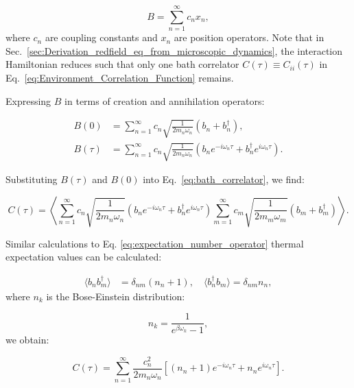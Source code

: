 \begin{equation} \label{eq:bath_operator}
	B = \sum_{n=1}^{\infty} c_n x_n,
\end{equation}
where \( c_n \) are coupling constants and \( x_n \) are position operators. Note that in Sec.~\ref{sec:Derivation_redfield_eq_from_microscopic_dynamics}, the interaction Hamiltonian reduces such that only one bath correlator \( C(\tau) \equiv C_{ii}(\tau) \) in Eq.~\eqref{eq:Environment_Correlation_Function} remains.

Expressing \( B \) in terms of creation and annihilation operators:

\begin{align}
	B(0)    & = \sum_{n=1}^{\infty} c_n \sqrt{\frac{1}{2 m_n \omega_n}} (b_n + b_n^\dagger), \label{eq:bath_operator_t0}                                                        \\
	B(\tau) & = \sum_{n=1}^{\infty} c_n \sqrt{\frac{1}{2 m_n \omega_n}} \left( b_n e^{-i \omega_n \tau} + b_n^\dagger e^{i \omega_n \tau} \right). \label{eq:bath_operator_tau}
\end{align}

Substituting \( B(\tau) \) and \( B(0) \) into Eq.~\eqref{eq:bath_correlator}, we find:

\begin{equation} \label{eq:correlator_substitution}
	C(\tau) = \left\langle \sum_{n=1}^{\infty} c_n \sqrt{\frac{1}{2 m_n \omega_n}} (b_n e^{-i \omega_n \tau} + b_n^\dagger e^{i \omega_n \tau}) \sum_{m=1}^{\infty} c_m \sqrt{\frac{1}{2 m_m \omega_m}} (b_m + b_m^\dagger) \right\rangle.
\end{equation}

Similar calculations to Eq. \eqref{eq:expectation_number_operator} thermal expectation values can be calculated:

\begin{align} \label{eq:thermal_expectations}
	\langle b_n b_m^\dagger \rangle & = \delta_{nm} (n_n + 1), \quad \langle b_n^\dagger b_m \rangle = \delta_{nm} n_n,
\end{align}
where \( n_k \) is the Bose-Einstein distribution:

\begin{equation} \label{eq:bose_einstein_distribution}
	n_k = \frac{1}{e^{\beta \omega_k} - 1},
\end{equation}
we obtain:

\begin{equation} \label{eq:correlator_result}
	C(\tau) = \sum_{n=1}^{\infty} \frac{c_n^2}{2 m_n \omega_n} \left[ (n_n + 1) e^{-i \omega_n \tau} + n_n e^{i \omega_n \tau} \right].
\end{equation}

